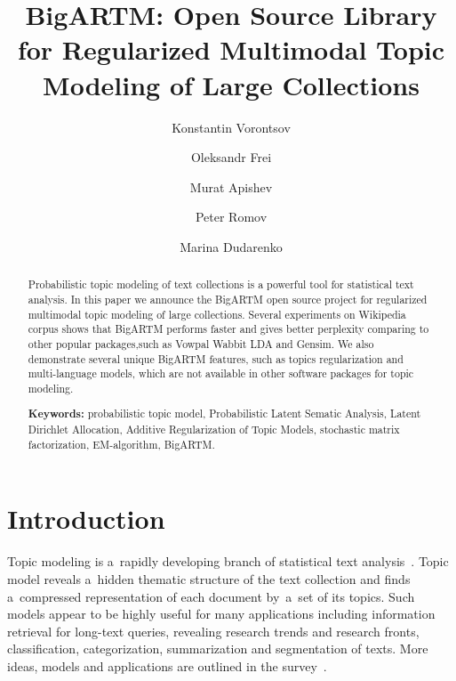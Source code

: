 \documentclass[russian]{llncs}
\begin{document}
\title{
    BigARTM: Open Source Library for
    Regularized Multimodal %
    Topic Modeling of Large Collections
}
\author{
    Konstantin Vorontsov
    \and
    Oleksandr Frei
    \and
    Murat Apishev
    \and
    Peter Romov
    \and
    Marina Dudarenko
}

\maketitle

\begin{abstract}
Probabilistic topic modeling of text collections is a powerful tool for statistical text analysis.
In this paper we announce the BigARTM open source project for regularized multimodal topic modeling of large collections.
Several experiments on Wikipedia corpus shows that BigARTM performs faster and gives better perplexity
comparing to other popular packages,such as Vowpal Wabbit LDA and Gensim.
We also demonstrate several unique BigARTM features, such as topics regularization and multi-language models,
which are not available in other software packages for topic modeling.

\vspace{1em}
\textbf{Keywords:}
    probabilistic topic model,
    Probabilistic Latent Sematic Analysis,
    Latent Dirichlet Allocation,
    Additive Regularization of Topic Models,
    stochastic matrix factorization,
    EM-algorithm,
    BigARTM.
\end{abstract}

\section{Introduction}

Topic modeling is a~rapidly developing branch of statistical text analysis~\cite{blei12ptm}.
Topic model reveals a~hidden thematic structure of the text collection
and finds a~compressed representation of each document by~a~set of its topics.
Such models appear to be highly useful for many applications including
information retrieval for long-text queries,
revealing research trends and research fronts,
classification, categorization, summarization and segmentation of texts.
More ideas, models and applications are outlined in the survey~\cite{daud10knowledge}.
\end{document}
